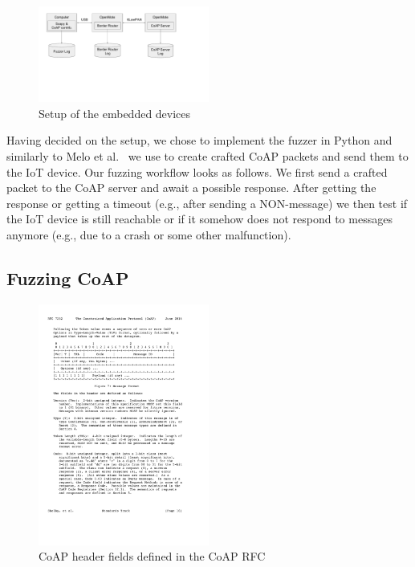\begin{figure}[h]
	\centering		
	\includegraphics[width=0.5\textwidth]{images/fuzzing_setup}
	\caption{Setup of the embedded devices}
	\label{figure:fuzzing_setup}
\end{figure}

Having decided on the setup, we chose to implement the fuzzer in Python and similarly to Melo et al.~\cite{Melo2017RobustnessTO} we use \scapy to create crafted CoAP packets and send them to the IoT device. Our fuzzing workflow looks as follows. We first send a crafted packet to the CoAP server and await a possible response. After getting the response or getting a timeout (e.g., after sending a NON-message) we then test if the IoT device is still reachable or if it somehow does not respond to messages anymore (e.g., due to a crash or some other malfunction). 

\subsection{Fuzzing CoAP}
\begin{figure}[h]
	\centering		
	\includegraphics[width=0.5\textwidth]{images/coap_message_format}
	\caption{CoAP header fields defined in the CoAP RFC~\cite{RFC7252}}
	\label{figure:coap_header}
\end{figure}

